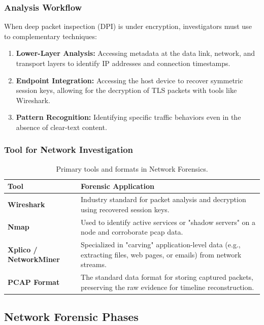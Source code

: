\subsubsection*{Analysis Workflow}
When deep packet inspection (DPI) is under encryption, investigators must use to complementary techniques:
\begin{enumerate}
    \item \textbf{Lower-Layer Analysis:} Accessing metadata at the data link, network, and transport layers to identify IP addresses and connection timestamps.
    \item \textbf{Endpoint Integration:} Accessing the host device to recover symmetric session keys, allowing for the decryption of TLS packets with tools like Wireshark.
    \item \textbf{Pattern Recognition:} Identifying specific traffic behaviors even in the absence of clear-text content.
\end{enumerate}

\subsubsection{Tool for Network Investigation}
\begin{table}[H]
\centering
\small
\begin{tabular}{|l|p{8.5cm}|}
\hline
\textbf{Tool} & \textbf{Forensic Application} \\
\hline
\textbf{Wireshark} & Industry standard for packet analysis and decryption using recovered session keys. \\
\hline
\textbf{Nmap} & Used to identify active services or "shadow servers" on a node and corroborate pcap data. \\
\hline
\textbf{Xplico / NetworkMiner} & Specialized in "carving" application-level data (e.g., extracting files, web pages, or emails) from network streams. \\
\hline
\textbf{PCAP Format} & The standard data format for storing captured packets, preserving the raw evidence for timeline reconstruction. \\
\hline
\end{tabular}
\caption{Primary tools and formats in Network Forensics.}
\end{table}

\subsection{Network Forensic Phases}

